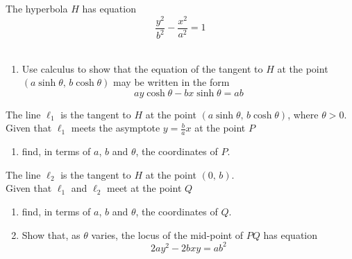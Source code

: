 \documentclass[leqno]{article}
\begin{document}
\begin{enumerate}[
  label=\textbf{\arabic*.},
  leftmargin=*,
  topsep=0pt,
  partopsep=0pt,
  parsep=0pt
]
The hyperbola $H$ has equation
\[
\frac{y^2}{b^2}-\frac{x^2}{a^2}=1
\] \\
\begin{enumerate}[label=\textbf{(\alph*)}]
  \item Use calculus to show that the equation of the tangent to $H$ at the point $(a\sinh\theta,\, b\cosh\theta)$ may be written in the form
  \[
  ay\cosh\theta-bx\sinh\theta=ab
  \]
\end{enumerate}
The line $\ell_1$ is the tangent to $H$ at the point $(a\sinh\theta,\, b\cosh\theta)$, where $\theta>0$. \\
Given that $\ell_1$ meets the asymptote $y=\frac{b}{a}x$ at the point $P$ \\
\begin{enumerate}[label=\textbf{(\alph*)}, resume]
  \item find, in terms of $a$, $b$ and $\theta$, the coordinates of $P$.  \\
\end{enumerate}
The line $\ell_2$ is the tangent to $H$ at the point $(0,\,b)$. \\
Given that $\ell_1$ and $\ell_2$ meet at the point $Q$ \\
\begin{enumerate}[label=\textbf{(\alph*)}, resume]
  \item find, in terms of $a$, $b$ and $\theta$, the coordinates of $Q$.  \\
  \item Show that, as $\theta$ varies, the locus of the mid-point of $PQ$ has equation
  \[
  2ay^2-2bxy=ab^2
  \]
\end{enumerate}


\end{enumerate}
\end{document}

